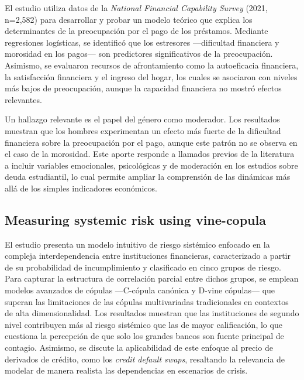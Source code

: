 \documentclass[11pt,a4paper]{article}
\begin{document}
El estudio utiliza datos de la \textit{National Financial Capability Survey} (2021, n=2,582) para desarrollar y probar un modelo teórico que explica los determinantes de la preocupación por el pago de los préstamos. Mediante regresiones logísticas, se identificó que los estresores ---dificultad financiera y morosidad en los pagos--- son predictores significativos de la preocupación. Asimismo, se evaluaron recursos de afrontamiento como la autoeficacia financiera, la satisfacción financiera y el ingreso del hogar, los cuales se asociaron con niveles más bajos de preocupación, aunque la capacidad financiera no mostró efectos relevantes.

Un hallazgo relevante es el papel del género como moderador. Los resultados muestran que los hombres experimentan un efecto más fuerte de la dificultad financiera sobre la preocupación por el pago, aunque este patrón no se observa en el caso de la morosidad. Este aporte responde a llamados previos de la literatura a incluir variables emocionales, psicológicas y de moderación en los estudios sobre deuda estudiantil, lo cual permite ampliar la comprensión de las dinámicas más allá de los simples indicadores económicos.

\subsection{Measuring systemic risk using vine-copula}

El estudio presenta un modelo intuitivo de riesgo sistémico enfocado en la compleja interdependencia entre instituciones financieras, caracterizado a partir de su probabilidad de incumplimiento y clasificado en cinco grupos de riesgo. Para capturar la estructura de correlación parcial entre dichos grupos, se emplean modelos avanzados de cópulas ---C-cópula canónica y D-vine cópulas--- que superan las limitaciones de las cópulas multivariadas tradicionales en contextos de alta dimensionalidad. Los resultados muestran que las instituciones de segundo nivel contribuyen más al riesgo sistémico que las de mayor calificación, lo que cuestiona la percepción de que solo los grandes bancos son fuente principal de contagio. Asimismo, se discute la aplicabilidad de este enfoque al precio de derivados de crédito, como los \textit{credit default swaps}, resaltando la relevancia de modelar de manera realista las dependencias en escenarios de crisis.
\end{document}
